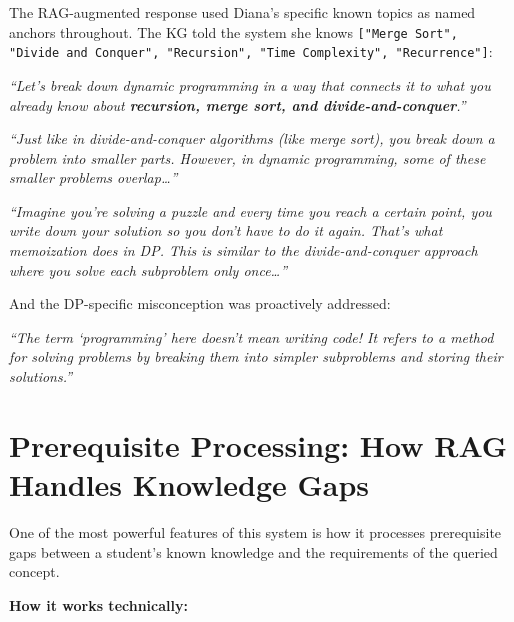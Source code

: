 \documentclass[12pt,a4paper]{article}
\newenvironment{ragbox}[1]{%
  \begin{tcolorbox}[
    title={\textbf{#1}},
    colback=ragbg,
    colframe=ragborder,
    colbacktitle=ragborder,
    coltitle=white,
    left=6pt, right=6pt, top=4pt, bottom=4pt,
    boxrule=0.5pt,
    arc=3pt,
    fonttitle=\small\bfseries,
    breakable,
  ]
  \small
}{%
  \end{tcolorbox}
}
\begin{document}
\begin{ragbox}{WITH RAG --- Diana}
The RAG-augmented response used Diana's specific known topics as named anchors
throughout. The KG told the system she knows
\texttt{["Merge Sort", "Divide and Conquer", "Recursion", "Time Complexity",
"Recurrence"]}:

\medskip
\textit{``Let's break down dynamic programming in a way that connects it to what
you already know about \textbf{recursion, merge sort, and
divide-and-conquer}.''}

\medskip
\textit{``Just like in divide-and-conquer algorithms (like merge sort), you
break down a problem into smaller parts. However, in dynamic programming, some
of these smaller problems overlap\ldots''}

\medskip
\textit{``Imagine you're solving a puzzle and every time you reach a certain
point, you write down your solution so you don't have to do it again. That's
what memoization does in DP. This is similar to the divide-and-conquer approach
where you solve each subproblem only once\ldots''}

\medskip
And the DP-specific misconception was proactively addressed:

\medskip
\textit{``The term `programming' here doesn't mean writing code! It refers to a
method for solving problems by breaking them into simpler subproblems and
storing their solutions.''}
\end{ragbox}

\section{Prerequisite Processing: How RAG Handles Knowledge Gaps}

One of the most powerful features of this system is how it processes prerequisite
gaps between a student's known knowledge and the requirements of the queried
concept.

\textbf{How it works technically:}
\end{document}
